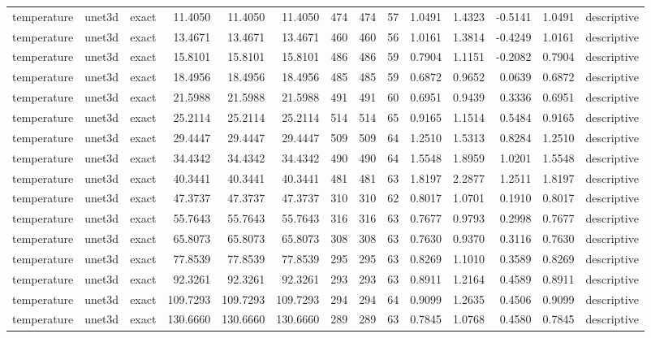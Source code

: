 \begin{tabular}{lllrrrrrrrrrrl}
temperature & unet3d & exact & 11.4050 & 11.4050 & 11.4050 & 474 & 474 & 57 & 1.0491 & 1.4323 & -0.5141 & 1.0491 & descriptive \\
temperature & unet3d & exact & 13.4671 & 13.4671 & 13.4671 & 460 & 460 & 56 & 1.0161 & 1.3814 & -0.4249 & 1.0161 & descriptive \\
temperature & unet3d & exact & 15.8101 & 15.8101 & 15.8101 & 486 & 486 & 59 & 0.7904 & 1.1151 & -0.2082 & 0.7904 & descriptive \\
temperature & unet3d & exact & 18.4956 & 18.4956 & 18.4956 & 485 & 485 & 59 & 0.6872 & 0.9652 & 0.0639 & 0.6872 & descriptive \\
temperature & unet3d & exact & 21.5988 & 21.5988 & 21.5988 & 491 & 491 & 60 & 0.6951 & 0.9439 & 0.3336 & 0.6951 & descriptive \\
temperature & unet3d & exact & 25.2114 & 25.2114 & 25.2114 & 514 & 514 & 65 & 0.9165 & 1.1514 & 0.5484 & 0.9165 & descriptive \\
temperature & unet3d & exact & 29.4447 & 29.4447 & 29.4447 & 509 & 509 & 64 & 1.2510 & 1.5313 & 0.8284 & 1.2510 & descriptive \\
temperature & unet3d & exact & 34.4342 & 34.4342 & 34.4342 & 490 & 490 & 64 & 1.5548 & 1.8959 & 1.0201 & 1.5548 & descriptive \\
temperature & unet3d & exact & 40.3441 & 40.3441 & 40.3441 & 481 & 481 & 63 & 1.8197 & 2.2877 & 1.2511 & 1.8197 & descriptive \\
temperature & unet3d & exact & 47.3737 & 47.3737 & 47.3737 & 310 & 310 & 62 & 0.8017 & 1.0701 & 0.1910 & 0.8017 & descriptive \\
temperature & unet3d & exact & 55.7643 & 55.7643 & 55.7643 & 316 & 316 & 63 & 0.7677 & 0.9793 & 0.2998 & 0.7677 & descriptive \\
temperature & unet3d & exact & 65.8073 & 65.8073 & 65.8073 & 308 & 308 & 63 & 0.7630 & 0.9370 & 0.3116 & 0.7630 & descriptive \\
temperature & unet3d & exact & 77.8539 & 77.8539 & 77.8539 & 295 & 295 & 63 & 0.8269 & 1.1010 & 0.3589 & 0.8269 & descriptive \\
temperature & unet3d & exact & 92.3261 & 92.3261 & 92.3261 & 293 & 293 & 63 & 0.8911 & 1.2164 & 0.4589 & 0.8911 & descriptive \\
temperature & unet3d & exact & 109.7293 & 109.7293 & 109.7293 & 294 & 294 & 64 & 0.9099 & 1.2635 & 0.4506 & 0.9099 & descriptive \\
temperature & unet3d & exact & 130.6660 & 130.6660 & 130.6660 & 289 & 289 & 63 & 0.7845 & 1.0768 & 0.4580 & 0.7845 & descriptive \\

\end{tabular}
